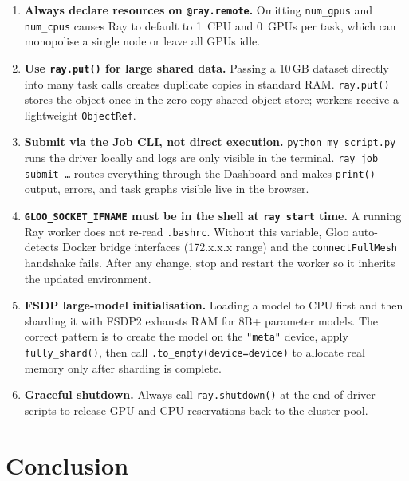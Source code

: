 \documentclass[12pt,a4paper]{article}
\begin{document}
\begin{enumerate}

\item \textbf{Always declare resources on \texttt{@ray.remote}.}
Omitting \texttt{num\_gpus} and \texttt{num\_cpus} causes Ray to
default to 1~CPU and 0~GPUs per task, which can monopolise a single
node or leave all GPUs idle.

\item \textbf{Use \texttt{ray.put()} for large shared data.}
Passing a 10\,GB dataset directly into many task calls creates
duplicate copies in standard RAM. \texttt{ray.put()} stores the object
once in the zero-copy shared object store; workers receive a lightweight
\texttt{ObjectRef}.

\item \textbf{Submit via the Job CLI, not direct execution.}
\texttt{python my\_script.py} runs the driver locally and logs are only
visible in the terminal. \texttt{ray job submit \ldots} routes
everything through the Dashboard and makes \texttt{print()} output,
errors, and task graphs visible live in the browser.

\item \textbf{\texttt{GLOO\_SOCKET\_IFNAME} must be in the shell at
\texttt{ray start} time.}
A running Ray worker does not re-read \texttt{.bashrc}. Without this
variable, Gloo auto-detects Docker bridge interfaces (172.x.x.x range)
and the \texttt{connectFullMesh} handshake fails. After any change,
stop and restart the worker so it inherits the updated environment.

\item \textbf{FSDP large-model initialisation.}
Loading a model to CPU first and then sharding it with FSDP2 exhausts
RAM for 8B+ parameter models. The correct pattern is to create the
model on the \texttt{"meta"} device, apply \texttt{fully\_shard()},
then call \texttt{.to\_empty(device=device)} to allocate real memory
only after sharding is complete.

\item \textbf{Graceful shutdown.}
Always call \texttt{ray.shutdown()} at the end of driver scripts to
release GPU and CPU reservations back to the cluster pool.

\end{enumerate}

\section{Conclusion}
\end{document}
